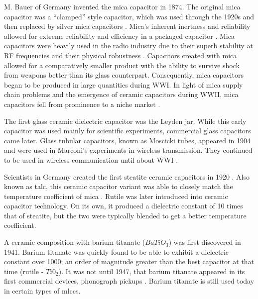 \nocite{hh}
\nocite{capGuide_mica}
M. Bauer of Germany invented the mica capacitor in 1874. The original mica capacitor was a ``clamped'' style capacitor, which was used through the 1920s \cite{wiki_mica} and then replaced by silver mica capacitors \cite{learn_caps}.
Mica's inherent inertness and reliability allowed for extreme reliability and efficiency in a packaged capacitor \cite{tedds_mica}. Mica capacitors were heavily used in the radio industry due to their superb stability at RF frequencies and their physical robustness \cite{radio_mica}.
Capacitors created with mica allowed for a comparatively smaller product \cite[f.~37-41]{dumInv} with the ability to survive shock from weapons better than its glass counterpart. Consequently, mica capacitors began to be produced in large quantities during WWI.
In light of mica supply chain problems and the emergence of ceramic capacitors during WWII, mica capacitors fell from prominence to a niche market \cite[Ch 3, Sec II]{cerMaterials}.

The first glass ceramic dielectric capacitor was the Leyden jar. While this early capacitor was used mainly for scientific experiments, commercial glass capacitors came later.
Glass tubular capacitors, known as Moscicki tubes, appeared in 1904 and were used in Marconi's experiments in wireless transmission. They continued to be used in wireless communication until about WWI \cite[p.~102]{dumInv}.

Scientists in Germany created the first steatite ceramic capacitors in 1920 \cite[Ch 3 Sec II]{cerMaterials}\cite{cerDie}. Also known as talc, this ceramic capacitor variant was able to closely match the temperature coefficient of mica \cite{steatite_hf}. Rutile was later introduced into ceramic capacitor technology. On its own, it produced a dielectric constant of 10 times that of steatite, but the two were typically blended to get a better temperature coefficient.

A ceramic composition with barium titanate ($BaTiO_3$) was first discovered in 1941. Barium titanate was quickly found to be able to exhibit a dielectric constant over 1000; an order of magnitude greater than the best capacitor at that time (rutile - $Ti0_2$). It was not until 1947, that barium titanate appeared in its first commercial devices, phonograph pickups \cite{piezCer}\cite{hist_cerFilt}\cite[Ch 3 Sec III]{cerMaterials}. Barium titanate is still used today in certain types of \glspl{mlcc}.

